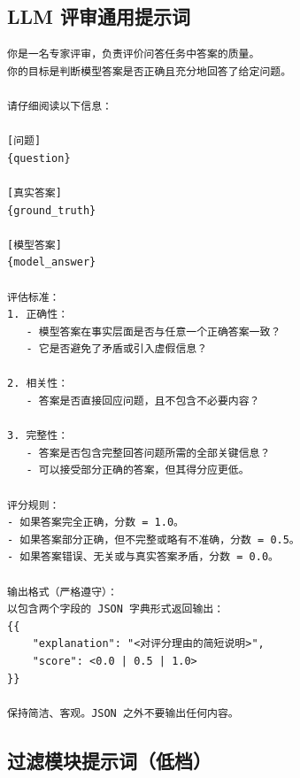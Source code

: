 \FloatBarrier
\subsection{LLM 评审通用提示词}

\begin{center}
\begin{tcolorbox}[title={LLM 评审通用提示词},breakable,enhanced]
{
\begin{Verbatim}[breaklines, breakanywhere, fontsize=\small,
                 fontfamily=tt, fontseries=b]
你是一名专家评审，负责评价问答任务中答案的质量。
你的目标是判断模型答案是否正确且充分地回答了给定问题。

请仔细阅读以下信息：

[问题]
{question}

[真实答案]
{ground_truth}

[模型答案]
{model_answer}

评估标准：
1. 正确性：
   - 模型答案在事实层面是否与任意一个正确答案一致？
   - 它是否避免了矛盾或引入虚假信息？

2. 相关性：
   - 答案是否直接回应问题，且不包含不必要内容？

3. 完整性：
   - 答案是否包含完整回答问题所需的全部关键信息？
   - 可以接受部分正确的答案，但其得分应更低。

评分规则：
- 如果答案完全正确，分数 = 1.0。
- 如果答案部分正确，但不完整或略有不准确，分数 = 0.5。
- 如果答案错误、无关或与真实答案矛盾，分数 = 0.0。

输出格式（严格遵守）：
以包含两个字段的 JSON 字典形式返回输出：
{{
    "explanation": "<对评分理由的简短说明>",
    "score": <0.0 | 0.5 | 1.0>
}}

保持简洁、客观。JSON 之外不要输出任何内容。
\end{Verbatim}
}
\end{tcolorbox}
\end{center}


\subsection{过滤模块提示词（低档）}


